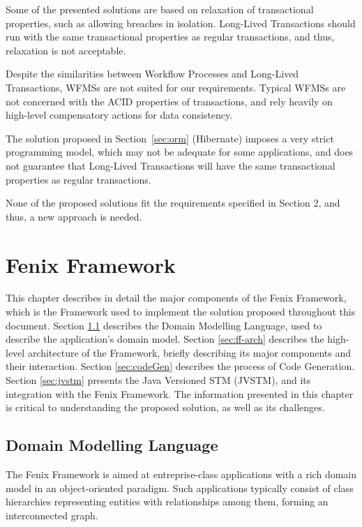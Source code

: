 \documentclass{llncs}
\begin{document}
Some of the presented solutions are based on relaxation of
transactional properties, such as allowing breaches in
isolation. Long-Lived Transactions should run with the same
transactional properties as regular transactions, and thus, relaxation
is not acceptable.

Despite the similarities between Workflow Processes and Long-Lived
Transactions, WFMSs are not suited for our requirements. Typical WFMSs
are not concerned with the ACID properties of transactions, and rely
heavily on high-level compensatory actions for data consistency.

The solution proposed in Section~\ref{sec:orm} (Hibernate) imposes a
very strict programming model, which may not be adequate for some
applications, and does not guarantee that Long-Lived Transactions will
have the same transactional properties as regular transactions.

None of the proposed solutions fit the requirements specified in
Section 2, and thus, a new approach is needed.


\section{Fenix Framework}
\label{chap:ff}

This chapter describes in detail the major components of the Fenix
Framework, which is the Framework used to implement the solution
proposed throughout this document. Section \ref{sec:dml} describes the
Domain Modelling Language, used to describe the application's domain
model. Section \ref{sec:ff-arch} describes the high-level architecture
of the Framework, briefly describing its major components and their
interaction. Section \ref{sec:codeGen} describes the process of Code
Generation. Section \ref{sec:jvstm} presents the Java Versioned STM
(JVSTM), and its integration with the Fenix Framework. The information
presented in this chapter is critical to understanding the proposed
solution, as well as its challenges.

\subsection{Domain Modelling Language}
\label{sec:dml}

The Fenix Framework is aimed at entreprise-class applications with a
rich domain model in an object-oriented paradigm. Such applications
typically consist of class hierarchies representing entities with
relationships among them, forming an interconnected graph. 
\end{document}
